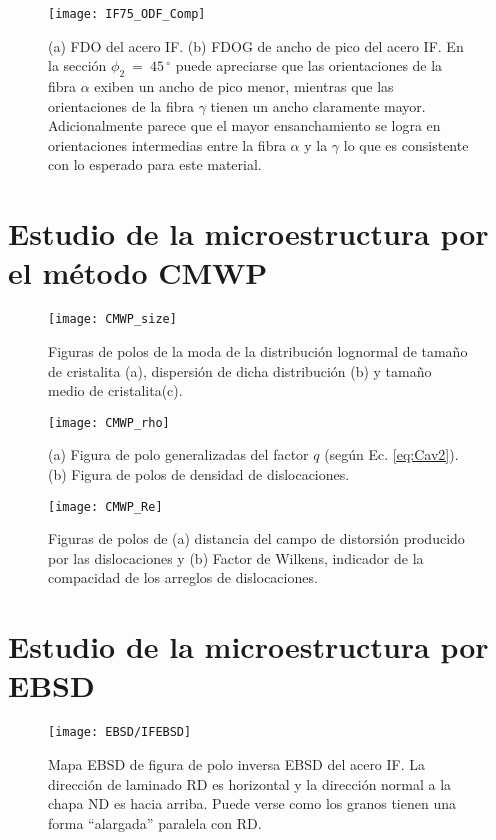 \begin{figure}[!htb]
  \centering
  \texttt{[image: IF75\_ODF\_Comp]}
  \caption{(a) FDO del acero IF. (b) FDOG de ancho de pico del acero IF. En la sección $\phi_2 \ = \ 45$\,$^{\circ}$ puede apreciarse que las orientaciones de la fibra $\alpha$ exiben un ancho de pico menor, mientras que las orientaciones de la fibra $\gamma$ tienen un ancho claramente mayor. Adicionalmente parece que el mayor ensanchamiento se logra en orientaciones intermedias entre la fibra $\alpha$ y la $\gamma$ lo que es consistente con lo esperado para este material.}
  \label{fig:IFODFComp}
\end{figure}

\newpage
\section{Estudio de la microestructura por el método CMWP}\label{S:IFCMWP}
\begin{figure}[!htb]
  \centering
  \texttt{[image: CMWP\_size]}
  \caption{Figuras de polos de la moda de la distribución lognormal de tamaño de cristalita (a), dispersión de dicha distribución (b) y tamaño medio de cristalita(c).}
  \label{fig:IFCMWPsize}
\end{figure}

\begin{figure}[!htb]
  \centering
  \texttt{[image: CMWP\_rho]}
  \caption{(a) Figura de polo generalizadas del factor $q$ (según Ec. \ref{eq:Cav2}). (b) Figura de polos de densidad de dislocaciones.}
  \label{fig:IFCMWPrho}
\end{figure}

\begin{figure}[!htb]
  \centering
  \texttt{[image: CMWP\_Re]}
  \caption{Figuras de polos de (a) distancia del campo de distorsión producido por las dislocaciones y (b) Factor de Wilkens, indicador de la compacidad de los arreglos de dislocaciones.}
  \label{fig:IFCMWPRe}
\end{figure}

\newpage
\section{Estudio de la microestructura por EBSD}\label{S:IFEBSD}

\begin{figure}[!htb]
  \centering
  \texttt{[image: EBSD/IFEBSD]}
  \caption{Mapa EBSD de figura de polo inversa EBSD del acero IF. La dirección de laminado RD es horizontal y la dirección normal a la chapa ND es hacia arriba. Puede verse como los granos tienen una forma ``alargada'' paralela con RD.}
  \label{fig:IFEBSD}
\end{figure}

